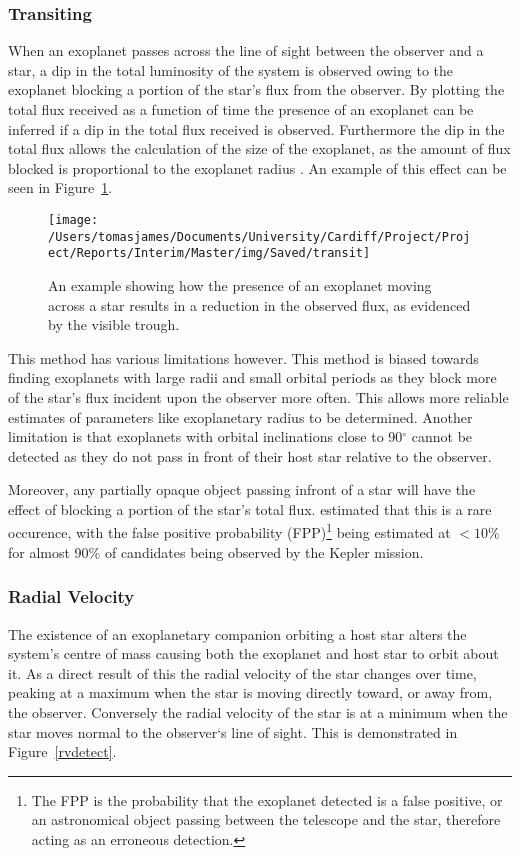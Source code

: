\documentclass{report}
\begin{document}
\subsubsection{Transiting}
When an exoplanet passes across the line of sight between the observer and a star, a dip in the total luminosity of the system is observed owing to the exoplanet blocking a portion of the star's flux from the observer. By plotting the total flux received as a function of time the presence of an exoplanet can be inferred if a dip in the total flux received is observed. Furthermore the dip in the total flux allows the calculation of the size of the exoplanet, as the amount of flux blocked is proportional to the exoplanet radius \parencite{radius}. An example of this effect can be seen in Figure~\ref{Transit}.

\begin{figure}[H]
\centering
    \texttt{[image: /Users/tomasjames/Documents/University/Cardiff/Project/Project/Reports/Interim/Master/img/Saved/transit]}
\caption[An example showing how the presence of an exoplanet moving across a star results in a reduction in the observed flux, as evidenced by the visible trough.]{An example showing how the presence of an exoplanet moving across a star results in a reduction in the observed flux, as evidenced by the visible trough. \parencite{transitimg}}\label{Transit}
\end{figure}

This method has various limitations however. This method is biased towards finding exoplanets with large radii and small orbital periods as they block more of the star’s flux incident upon the observer more often. This allows more reliable estimates of parameters like exoplanetary radius to be determined. Another limitation is that exoplanets with orbital inclinations close to 90$^\circ$ cannot be detected as they do not pass in front of their host star relative to the observer.

Moreover, any partially opaque object passing infront of a star will have the effect of blocking a portion of the star's total flux. \textcite{false} estimated that this is a rare occurence, with the false positive probability (FPP)\footnote{The FPP is the probability that the exoplanet detected is a false positive, or an astronomical object passing between the telescope and the star, therefore acting as an erroneous detection.} being estimated at $<10\%$ for almost 90\% of candidates being observed by the Kepler mission.

\subsubsection{Radial Velocity }
The existence of an exoplanetary companion orbiting a host star alters the system's centre of mass causing both the exoplanet and host star to orbit about it. As a direct result of this the radial velocity of the star changes over time, peaking at a maximum when the star is moving directly toward, or away from, the observer. Conversely the radial velocity of the star is at a minimum when the star moves normal to the observer`s line of sight. This is demonstrated in Figure~\ref{rvdetect}.
\end{document}
